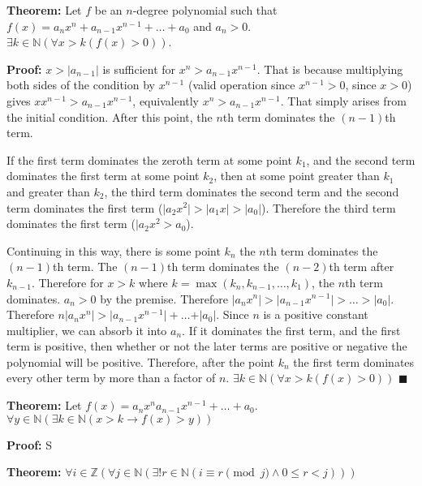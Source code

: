 

\setcounter{enumii}{10}
\item \textbf{Theorem:} Let \(f\) be an \(n\)-degree polynomial such that \(f(x) = a_n x^n + a_{n-1} x^{n-1} + \dots + a_0 \) and \(a_n > 0\). \(\exists k \in \mathbb N (\forall x > k (f(x) > 0))\).

\textbf{Proof:} \(x > \lvert a_{n-1} \rvert\) is sufficient for \(x^n > a_{n-1} x^{n-1}\). That is because multiplying both sides of the condition by \(x^{n-1}\) (valid operation since \(x^{n-1}>0\), since \(x>0\)) gives \(x x^{n-1} > a_{n-1} x^{n-1}\), equivalently \(x^n  > a_{n-1} x^{n-1}\). That simply arises from the initial condition. After this point, the \(n\)th term dominates the \((n-1)\)th term.

If the first term dominates the zeroth term at some point \(k_1\), and the second term dominates the first term at some point \(k_2\), then at some point greater than \(k_1\) and greater than \(k_2\), the third term dominates the second term and the second term dominates the first term (\(\lvert a_2 x^2 \rvert > \lvert a_1 x \rvert > \lvert a_0 \rvert\)). Therefore the third term dominates the first term (\(\lvert a_2 x^2 > a_0\)). 

Continuing in this way, there is some point \(k_n\) the \(n\)th term dominates the \((n-1)\)th term. The \((n-1)\)th term dominates the \((n-2)\)th term after \(k_{n-1}\). Therefore for \(x > k\) where \(k = \max(k_n, k_{n-1}, \dots, k_1)\), the \(n\)th term dominates. \(a_n > 0\) by the premise. Therefore \(\lvert a_n x^n \rvert > \lvert a_{n-1} x^{n-1} \rvert > \dots > \rvert a_0 \lvert\). Therefore \(n \lvert a_n x^n \rvert > \lvert a_{n-1} x^{n-1} \rvert + \dots + \rvert a_0 \lvert\). Since \(n\) is a positive constant multiplier, we can absorb it into \(a_n\). If it dominates the first term, and the first term is positive, then whether or not the later terms are positive or negative the polynomial will be positive. Therefore, after the point \(k_n\) the first term dominates every other term by more than a factor of \(n\). \(\exists k \in \mathbb N (\forall x > k (f(x) > 0))\) {\tiny \(\blacksquare\)}

\item \textbf{Theorem:} Let \(f(x) = a_n x^n a_{n-1} x^{n-1} + \dots + a_0\). \(\forall y \in \mathbb N (\exists k \in \mathbb N (x > k \rightarrow f(x) > y))\)

\textbf{Proof:} S

\setcounter{enumii}{13}
\item \textbf{Theorem:} \(\forall i \in \mathbb Z (\forall j \in \mathbb N (\exists ! r \in \mathbb N (i \equiv r \pmod j \wedge 0 \leq r < j)))\)

